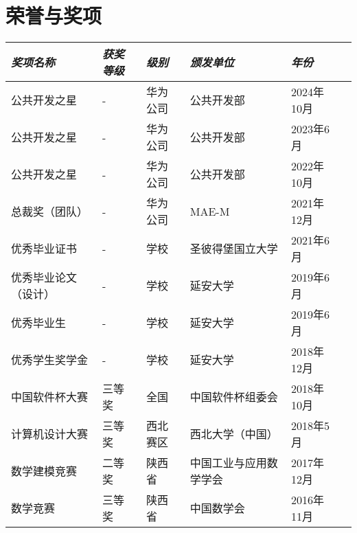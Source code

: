 \documentclass[UTF8,10pt]{ctexart}
\newcommand{\awardsTable}[1]{
	\begin{tabularx}{\textwidth}{llllll}
	\emph{奖项名称}	& \emph{获奖等级}	& \emph{级别}	& \emph{颁发单位} & \emph{年份}       \\
	\midrule\midrule
	#1
	\end{tabularx}
}
\newcommand{\awardsTableRow}[6]{
	\BeginAccSupp{method=plain, ActualText=11\string\t 21}#1 & #2 & #3 & #4 & #5\EndAccSupp{} \\
}
\begin{document}
\section{荣誉与奖项}
\setlength{\tabcolsep}{6.0pt}
\renewcommand{\arraystretch}{1.1}
\fontsize{8.5}{11}\selectfont
\awardsTable{
  \awardsTableRow{公共开发之星}{-}{华为公司}{公共开发部}{2024年10月} \\
  \awardsTableRow{公共开发之星}{-}{华为公司}{公共开发部}{2023年6月} \\
  \awardsTableRow{公共开发之星}{-}{华为公司}{公共开发部}{2022年10月} \\
  \awardsTableRow{总裁奖（团队）}{-}{华为公司}{MAE-M}{2021年12月} \\
  \awardsTableRow{优秀毕业证书}{-}{学校}{圣彼得堡国立大学}{2021年6月} \\
  \awardsTableRow{优秀毕业论文（设计）}{-}{学校}{延安大学}{2019年6月} \\
  \awardsTableRow{优秀毕业生}{-}{学校}{延安大学}{2019年6月} \\
  \awardsTableRow{优秀学生奖学金}{-}{学校}{延安大学}{2018年12月} \\
  \awardsTableRow{中国软件杯大赛}{三等奖}{全国}{中国软件杯组委会}{2018年10月} \\
  \awardsTableRow{计算机设计大赛}{三等奖}{西北赛区}{西北大学（中国）}{2018年5月} \\
  \awardsTableRow{数学建模竞赛}{二等奖}{陕西省}{中国工业与应用数学学会}{2017年12月} \\
  \awardsTableRow{数学竞赛}{三等奖}{陕西省}{中国数学会}{2016年11月} \\ \hline }
\end{document}
